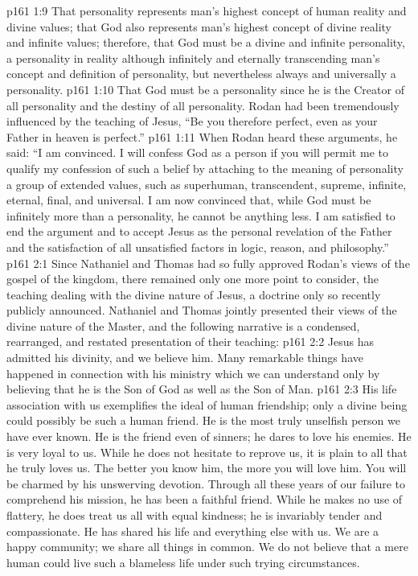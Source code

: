 \pc \vs p161 1:9 \bibnobreakspace That personality represents man’s highest concept of human reality and divine values; that God also represents man’s highest concept of divine reality and infinite values; therefore, that God must be a divine and infinite personality, a personality in reality although infinitely and eternally transcending man’s concept and definition of personality, but nevertheless always and universally a personality.
\pc \vs p161 1:10 \bibnobreakspace That God must be a personality since he is the Creator of all personality and the destiny of all personality. Rodan had been tremendously influenced by the teaching of Jesus, \textcolor{ubdarkred}{“Be you therefore perfect, even as your Father in heaven is perfect.”}
\pc \vs p161 1:11 When Rodan heard these arguments, he said: “I am convinced. I will confess God as a person if you will permit me to qualify my confession of such a belief by attaching to the meaning of personality a group of extended values, such as superhuman, transcendent, supreme, infinite, eternal, final, and universal. I am now convinced that, while God must be infinitely more than a personality, he cannot be anything less. I am satisfied to end the argument and to accept Jesus as the personal revelation of the Father and the satisfaction of all unsatisfied factors in logic, reason, and philosophy.”
\vs p161 2:1 Since Nathaniel and Thomas had so fully approved Rodan’s views of the gospel of the kingdom, there remained only one more point to consider, the teaching dealing with the divine nature of Jesus, a doctrine only so recently publicly announced. Nathaniel and Thomas jointly presented their views of the divine nature of the Master, and the following narrative is a condensed, rearranged, and restated presentation of their teaching:
\pc \vs p161 2:2 \bibnobreakspace Jesus has admitted his divinity, and we believe him. Many remarkable things have happened in connection with his ministry which we can understand only by believing that he is the Son of God as well as the Son of Man.
\pc \vs p161 2:3 \bibnobreakspace His life association with us exemplifies the ideal of human friendship; only a divine being could possibly be such a human friend. He is the most truly unselfish person we have ever known. He is the friend even of sinners; he dares to love his enemies. He is very loyal to us. While he does not hesitate to reprove us, it is plain to all that he truly loves us. The better you know him, the more you will love him. You will be charmed by his unswerving devotion. Through all these years of our failure to comprehend his mission, he has been a faithful friend. While he makes no use of flattery, he does treat us all with equal kindness; he is invariably tender and compassionate. He has shared his life and everything else with us. We are a happy community; we share all things in common. We do not believe that a mere human could live such a blameless life under such trying circumstances.
